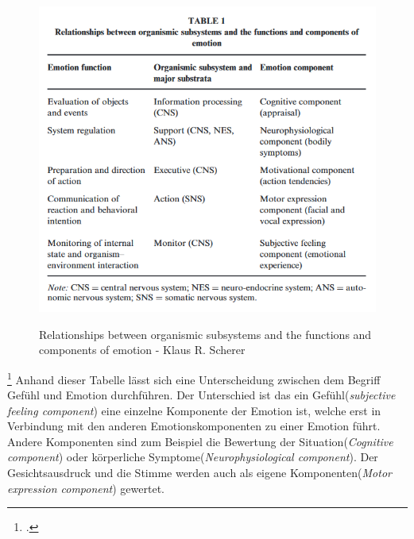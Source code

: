 \begin{figure}[h]
	\centering
	\includegraphics[width=14cm]{Bilder/Relationships-between-organismic-subsystems.png}
	\label{img:Emotion}
	\caption[Relationships between organismic subsystems and the functions and components of
	emotion - Klaus R. Scherer]{Relationships between organismic subsystems and the functions and components of
		emotion - Klaus R. Scherer\footnotemark}
\end{figure}%
\footcitetext[Vgl.][S.698 Table 1]{Kla05}
Anhand dieser Tabelle lässt sich eine Unterscheidung zwischen dem Begriff Gefühl und Emotion durchführen. Der Unterschied ist das ein Gefühl(\textit{subjective feeling component}) eine einzelne Komponente der Emotion ist, welche erst in Verbindung mit den anderen Emotionskomponenten zu einer Emotion führt. Andere Komponenten sind zum Beispiel die Bewertung der Situation(\textit{Cognitive component}) oder körperliche Symptome(\textit{Neurophysiological component}). Der Gesichtsausdruck und die Stimme werden auch als eigene Komponenten(\textit{Motor expression component}) gewertet. 
